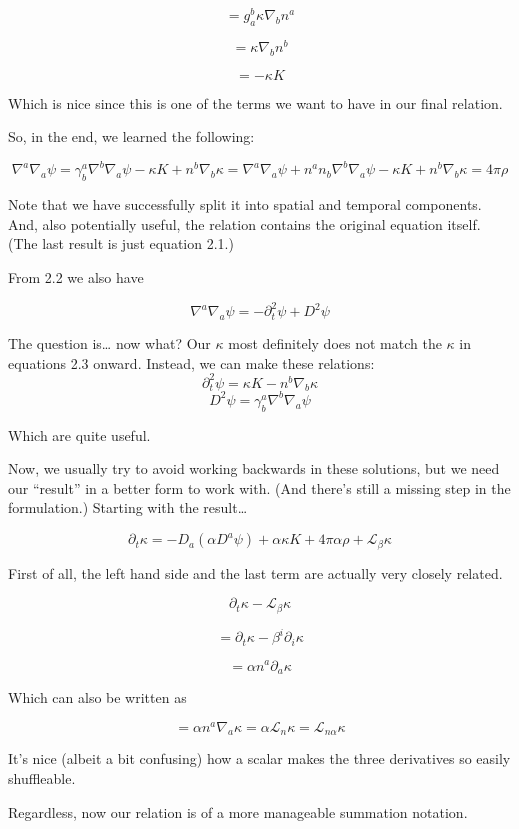 \documentclass[landscape,letterpaper,10pt,english]{article}
\begin{document}
\[ = g^b_a \kappa \nabla_b n^a \]

\[ = \kappa \nabla_b n^b \]

\[ = - \kappa K \]

Which is nice since this is one of the terms we want to have in our
final relation.

So, in the end, we learned the following:

\[ \nabla^a \nabla_a \psi = \gamma^a_b \nabla^b \nabla_a \psi - \kappa K + n^b \nabla_b \kappa = \nabla^a \nabla_a \psi + n^an_b \nabla^b \nabla_a \psi -\kappa K + n^b \nabla_b \kappa = 4\pi \rho\]

Note that we have successfully split it into spatial and temporal
components. And, also potentially useful, the relation contains the
original equation itself. (The last result is just equation 2.1.)

From 2.2 we also have

\[ \nabla^a \nabla_a \psi = -\partial_t^2 \psi + D^2 \psi \]

    The question is\ldots{} now what? Our \(\kappa\) most definitely does
not match the \(\kappa\) in equations 2.3 onward. Instead, we can make
these relations:
\[ \partial_t^2 \psi = \kappa K - n^b \nabla_b \kappa \]
\[ D^2 \psi = \gamma^a_b \nabla^b \nabla_a \psi \]

    Which are quite useful.

Now, we usually try to avoid working backwards in these solutions, but
we need our ``result'' in a better form to work with. (And there's still
a missing step in the formulation.) Starting with the result\ldots{}

\[ \partial_t \kappa = -D_a(\alpha D^a \psi) + \alpha \kappa K + 4\pi \alpha\rho + \mathcal{L}_\beta \kappa \]

First of all, the left hand side and the last term are actually very
closely related.

\[ \partial_t \kappa - \mathcal{L}_\beta \kappa \]

\[ = \partial_t \kappa - \beta^i \partial_i \kappa \]

\[ = \alpha n^a \partial_a \kappa \]

Which can also be written as

\[ = \alpha n^a \nabla_a \kappa = \alpha \mathcal{L}_n \kappa = \mathcal{L}_{n\alpha} \kappa\]

It's nice (albeit a bit confusing) how a scalar makes the three
derivatives so easily shuffleable.

    Regardless, now our relation is of a more manageable summation notation.
\end{document}
